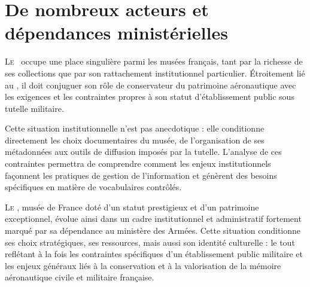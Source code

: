\chapter[Acteurs et dépendances]{\label{I-B}De nombreux acteurs et dépendances ministérielles }


\lettrine{L}e \maelong~occupe une place singulière parmi les musées français, tant par la richesse de ses collections que par son rattachement institutionnel particulier. Étroitement lié au \minarm, il doit conjuguer son rôle de conservateur du patrimoine aéronautique avec les exigences et les contraintes propres à son statut d’établissement public sous tutelle militaire.

Cette situation institutionnelle n'est pas anecdotique : elle conditionne directement les choix documentaires du musée, de l'organisation de ses métadonnées aux outils de diffusion imposés par la tutelle. L'analyse de ces contraintes permettra de comprendre comment les enjeux institutionnels façonnent les pratiques de gestion de l'information et génèrent des besoins spécifiques en matière de vocabulaires contrôlés.





\bigskip
\bigskip
\bigskip

\lettrine{L}{e} \maelong, musée de France doté d’un statut prestigieux et d’un patrimoine exceptionnel, évolue ainsi dans un cadre institutionnel et administratif fortement marqué par sa dépendance au ministère des Armées. Cette situation conditionne ses choix stratégiques, ses ressources, mais aussi son identité culturelle : le tout reflétant à la fois les contraintes spécifiques d’un établissement public militaire et les enjeux généraux liés à la conservation et à la valorisation de la mémoire aéronautique civile et militaire française. 

\bigskip
\bigskip
\bigskip